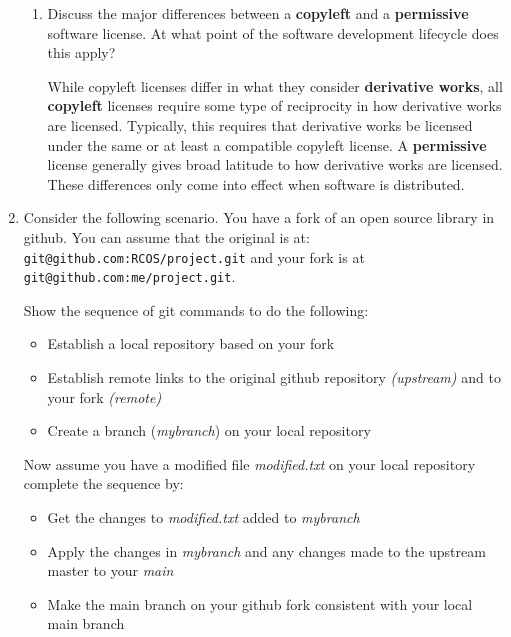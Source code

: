 \documentclass[10pt]{article}
\begin{document}
\begin{enumerate}
\begin{enumerate}
	\item Discuss the major differences between a \textbf{copyleft} and a \textbf{permissive} software license. At what point of the software development lifecycle does this apply?
	
	\beginanswers
	While copyleft licenses differ in what they consider \textbf{derivative works}, all \textbf{copyleft} licenses require some type of reciprocity in how derivative works are licensed. Typically, this requires that derivative works be licensed under the same or at least a compatible copyleft license. A \textbf{permissive} license generally gives broad latitude to how derivative works are licensed. These differences only come into effect when software is distributed.
\else
\bigskip
\bigskip
\bigskip
\bigskip
\bigskip
\bigskip
\bigskip
\bigskip
\bigskip
\bigskip
\bigskip
\bigskip
\bigskip
\bigskip
\bigskip
\bigskip
\bigskip
\bigskip
\bigskip
\bigskip
\fi
\end{enumerate}
	
\newpage


\item Consider the following scenario. You have a fork of an open source library in github. You can assume that the original is at: \verb*|git@github.com:RCOS/project.git| and your fork is at \verb*|git@github.com:me/project.git|.

Show the sequence of git commands to do the following:
\begin{itemize}
	\item Establish a local repository based on your fork
	\item Establish remote links to the original github repository \textit{(upstream)} and to your fork \textit{(remote)}
	\item Create a branch (\textit{mybranch}) on your local repository
\end{itemize}

Now assume you have a modified file \textit{modified.txt} on your local repository complete the sequence by:

\begin{itemize}
	\item Get the changes to \textit{modified.txt} added to \textit{mybranch}
	\item Apply the changes in \textit{mybranch} and any changes made to the upstream master to your \textit{main}
	\item Make the main branch on your github fork consistent with your local main branch
\end{itemize}


\end{enumerate}
\end{document}
